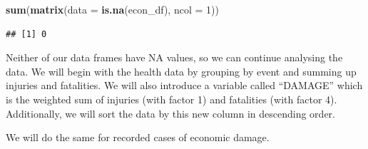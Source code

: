 \documentclass[]{article}
\newenvironment{Shaded}{\begin{snugshade}}{\end{snugshade}}
\newcommand{\KeywordTok}[1]{\textcolor[rgb]{0.13,0.29,0.53}{\textbf{{#1}}}}
\newcommand{\DataTypeTok}[1]{\textcolor[rgb]{0.13,0.29,0.53}{{#1}}}
\newcommand{\DecValTok}[1]{\textcolor[rgb]{0.00,0.00,0.81}{{#1}}}
\newcommand{\StringTok}[1]{\textcolor[rgb]{0.31,0.60,0.02}{{#1}}}
\newcommand{\NormalTok}[1]{{#1}}
\begin{document}
\begin{Shaded}
\begin{Highlighting}[]
\KeywordTok{sum}\NormalTok{(}\KeywordTok{matrix}\NormalTok{(}\DataTypeTok{data =} \KeywordTok{is.na}\NormalTok{(econ_df), }\DataTypeTok{ncol =} \DecValTok{1}\NormalTok{))}
\end{Highlighting}
\end{Shaded}

\begin{verbatim}
## [1] 0
\end{verbatim}

Neither of our data frames have NA values, so we can continue analysing
the data. We will begin with the health data by grouping by event and
summing up injuries and fatalities. We will also introduce a variable
called ``DAMAGE'' which is the weighted sum of injuries (with factor 1)
and fatalities (with factor 4). Additionally, we will sort the data by
this new column in descending order.

\begin{Shaded}
\end{Shaded}

We will do the same for recorded cases of economic damage.

\begin{Shaded}
\end{Shaded}
\end{document}
